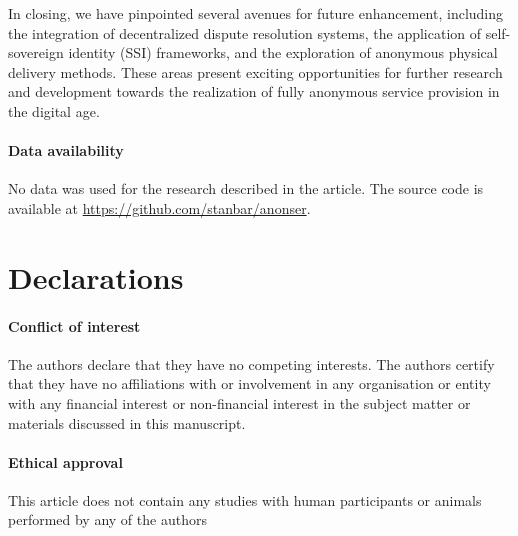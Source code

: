 \documentclass[pdftex,twocolumn,epjc3]{svjour3}
\begin{document}
In closing, we have pinpointed several avenues for future enhancement, including the integration of decentralized dispute resolution systems, the application of self-sovereign identity (SSI) frameworks, and the exploration of anonymous physical delivery methods. These areas present exciting opportunities for further research and development towards the realization of fully anonymous service provision in the digital age.

\paragraph{Data availability}
No data was used for the research described in the article.
The source code is available at \url{https://github.com/stanbar/anonser}.

\section*{Declarations}

\paragraph{Conflict of interest} The authors declare that they have no competing interests. The authors certify that they have no affiliations with or involvement in any organisation or entity with any financial interest or non-financial interest in the subject matter or materials discussed in this manuscript.

\paragraph{Ethical approval} This article does not contain any studies with human participants or animals performed by any of the authors


\appendix
\end{document}
